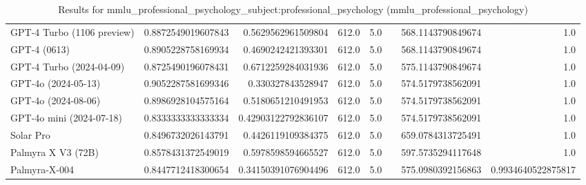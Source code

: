 \begin{table}[htp]
{\begin{tabular}{lrrrrrrr}
GPT-4 Turbo (1106 preview) & 0.8872549019607843 & 0.5629562961509804 & 612.0 & 5.0 &  & 568.1143790849674 & 1.0 \\
GPT-4 (0613) & 0.8905228758169934 & 0.4690242421393301 & 612.0 & 5.0 &  & 568.1143790849674 & 1.0 \\
GPT-4 Turbo (2024-04-09) & 0.8725490196078431 & 0.6712259284031936 & 612.0 & 5.0 &  & 575.1143790849674 & 1.0 \\
GPT-4o (2024-05-13) & 0.9052287581699346 & 0.330327843528947 & 612.0 & 5.0 &  & 574.5179738562091 & 1.0 \\
GPT-4o (2024-08-06) & 0.8986928104575164 & 0.5180651210491953 & 612.0 & 5.0 &  & 574.5179738562091 & 1.0 \\
GPT-4o mini (2024-07-18) & 0.8333333333333334 & 0.42903122792836107 & 612.0 & 5.0 &  & 574.5179738562091 & 1.0 \\
Solar Pro & 0.8496732026143791 & 0.4426119109384375 & 612.0 & 5.0 &  & 659.0784313725491 & 1.0 \\
Palmyra X V3 (72B) & 0.8578431372549019 & 0.5978598594665527 & 612.0 & 5.0 &  & 597.5735294117648 & 1.0 \\
Palmyra-X-004 & 0.8447712418300654 & 0.34150391076904496 & 612.0 & 5.0 &  & 575.0980392156863 & 0.9934640522875817 \\
\bottomrule
\end{tabular}}
\caption{Results for mmlu_professional_psychology_subject:professional_psychology (mmlu_professional_psychology)}
\label{fig:mmlu_professional_psychology_subject:professional_psychology (mmlu_professional_psychology)}
\end{table}